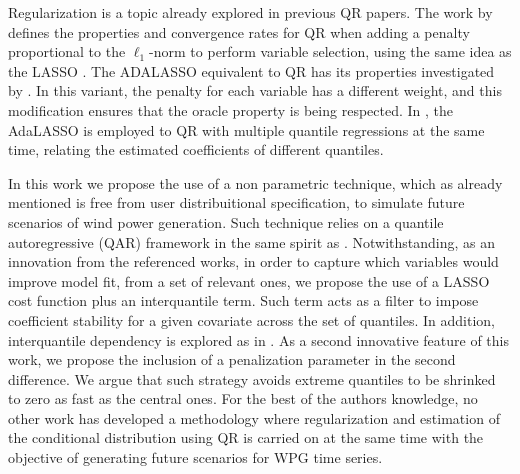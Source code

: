 Regularization is a topic already explored in previous QR papers.
The work by \cite{belloni_l1-penalized_2009} defines the properties and convergence rates for QR when adding a penalty proportional to the $\ell_1$-norm to perform variable selection, using the same idea as the LASSO \cite{tibshirani1996regression}. The ADALASSO equivalent to QR has its properties investigated by \cite{ciuperca_adaptive_2016}. In this variant, the penalty for each variable has a different weight, and this modification ensures that the oracle property is being respected. 
In \cite{zou_regularized_2008,jiang_interquantile_2014}, the AdaLASSO is employed to QR with multiple quantile regressions at the same time, relating the estimated coefficients of different quantiles.

In this work we propose the use of a non parametric technique, which as already mentioned is free from user distribuitional specification, to simulate future scenarios of wind power generation. Such technique relies on a quantile autoregressive (QAR) framework in the same spirit as \cite{koenker1978regression,koenker_quantile_2006,koenker2005quantile}. Notwithstanding, as an innovation from the referenced works, in order to capture which variables would improve model fit, from a set of relevant ones, we propose the use of a LASSO cost function plus an interquantile term. Such term acts as a filter to impose coefficient stability for a given covariate across the set of quantiles. In addition, interquantile dependency is explored as in \cite{zou_regularized_2008,jiang_interquantile_2014}. As a second innovative feature of this work, we propose the inclusion of a penalization parameter in the second difference. We argue that such strategy avoids extreme quantiles to be shrinked to zero as fast as the central ones. For the best of the authors knowledge, no other work has developed a methodology where regularization and estimation of the conditional distribution using QR is carried on at the same time with the objective of generating future scenarios for WPG time series.



